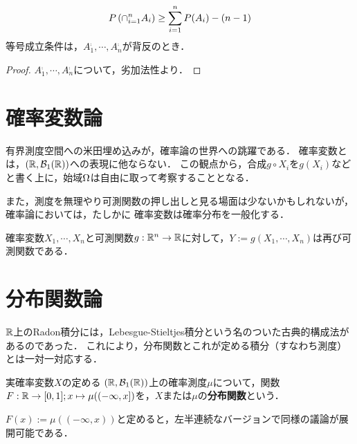 \documentclass[uplatex,dvipdfmx]{jsreport}
\begin{document}
\begin{proposition}[Bonferroniの不等式]
    \[P\left(\cap_{i=1}^nA_i\right)\ge\sum^n_{i=1}P(A_i)-(n-1)\]
    等号成立条件は，$A^\comp_1,\cdots,A^\comp_n$が背反のとき．
\end{proposition}
\begin{proof}
    $A^\comp_1,\cdots,A^\comp_n$について，劣加法性より．
\end{proof}

\section{確率変数論}

\begin{tcolorbox}[colframe=ForestGreen, colback=ForestGreen!10!white,breakable,colbacktitle=ForestGreen!40!white,coltitle=black,fonttitle=\bfseries\sffamily,
title=]
    有界測度空間への米田埋め込みが，確率論の世界への跳躍である．
    確率変数とは，$(\mathbb{R},\mathcal{B}_1(\mathbb{R}))$への表現に他ならない．
    この観点から，合成$g\circ X_i$を$g(X_i)$などと書く上に，始域$\Omega$は自由に取って考察することとなる．

    また，測度を無理やり可測関数の押し出しと見る場面は少ないかもしれないが，確率論においては，たしかに
    確率変数は確率分布を一般化する．
\end{tcolorbox}

\begin{proposition}[確率変数の構成]
    確率変数$X_1,\cdots,X_n$と可測関数$g:\mathbb{R}^n\to\mathbb{R}$に対して，$Y:=g(X_1,\cdots,X_n)$は再び可測関数である．
\end{proposition}

\section{分布関数論}

\begin{tcolorbox}[colframe=ForestGreen, colback=ForestGreen!10!white,breakable,colbacktitle=ForestGreen!40!white,coltitle=black,fonttitle=\bfseries\sffamily,
title=]
    $\mathbb{R}$上のRadon積分には，Lebesgue-Stieltjes積分という名のついた古典的構成法があるのであった．
    これにより，分布関数とこれが定める積分（すなわち測度）とは一対一対応する．
\end{tcolorbox}

\begin{definition}
    実確率変数$X$の定める
    $(\mathbb{R},\mathcal{B}_1(\mathbb{R}))$上の確率測度$\mu$について，関数$F:\mathbb{R}\to[0,1];x\mapsto\mu((-\infty,x])$を，$X$または$\mu$の\textbf{分布関数}という．
\end{definition}
\begin{remark}
    $F(x):=\mu((-\infty,x))$と定めると，左半連続なバージョンで同様の議論が展開可能である．
\end{remark}
\end{document}
